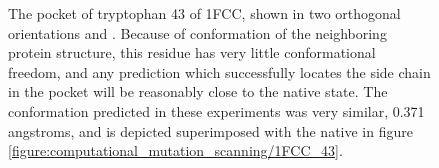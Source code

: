 \begin{figure}
\begin{subfigure}[b]{0.3\textwidth}
        \caption{}
        \label{figure:mutation_side_chain_images/in_pocket_in_plane.png}
    \end{subfigure}
    \caption{The pocket of tryptophan 43 of 1FCC, shown in two orthogonal orientations \label{figure:mutation_side_chain_images/in_pocket_out_of_plane} and \label{figure:mutation_side_chain_images/in_pocket_in_plane.png}.
Because of conformation of the neighboring protein structure, this residue has very little conformational freedom, and any prediction which successfully locates the side chain in the pocket will be reasonably close to the native state.
The conformation predicted in these experiments was very similar, 0.371 angstroms, and is depicted superimposed with the native in figure \protect\ref{figure:computational_mutation_scanning/1FCC_43}.}
    \label{figure:1fcc_43_pocket}
\end{figure}



